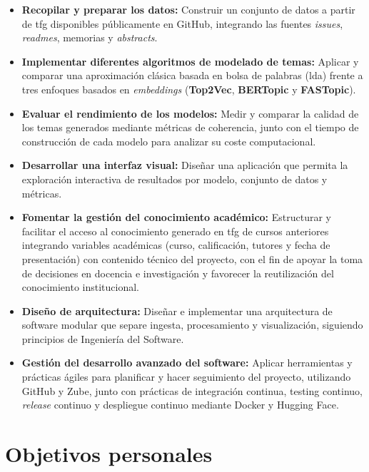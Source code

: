 \begin{itemize}
    \item \textbf{Recopilar y preparar los datos:} Construir un conjunto de datos a partir de \acrshort{tfg} disponibles públicamente en GitHub, integrando las fuentes \textit{issues}, \textit{readmes}, memorias y \textit{abstracts}.

    \item \textbf{Implementar diferentes algoritmos de modelado de temas:} Aplicar y comparar una aproximación clásica basada en bolsa de palabras (\acrshort{lda}) frente a tres enfoques basados en \textit{embeddings} (\textbf{Top2Vec}, \textbf{BERTopic} y \textbf{FASTopic}).

    \item \textbf{Evaluar el rendimiento de los modelos:} Medir y comparar la calidad de los temas generados mediante métricas de coherencia, junto con el tiempo de construcción de cada modelo para analizar su coste computacional.

    \item \textbf{Desarrollar una interfaz visual:} Diseñar una aplicación que permita la exploración interactiva de resultados por modelo, conjunto de datos y métricas.

    \item \textbf{Fomentar la gestión del conocimiento académico:} Estructurar y facilitar el acceso al conocimiento generado en \acrshort{tfg} de cursos anteriores integrando variables académicas (curso, calificación, tutores y fecha de presentación) con contenido técnico del proyecto, con el fin de apoyar la toma de decisiones en docencia e investigación y favorecer la reutilización del conocimiento institucional.

    \item \textbf{Diseño de arquitectura:} Diseñar e implementar una arquitectura de software modular que separe ingesta, procesamiento y visualización, siguiendo principios de Ingeniería del Software.

    \item \textbf{Gestión del desarrollo avanzado del software:} Aplicar herramientas y prácticas ágiles para planificar y hacer seguimiento del proyecto, utilizando GitHub y Zube, junto con prácticas de integración continua, testing continuo, \textit{release} continuo y despliegue continuo mediante Docker y Hugging Face.

\end{itemize}

\section{Objetivos personales}

